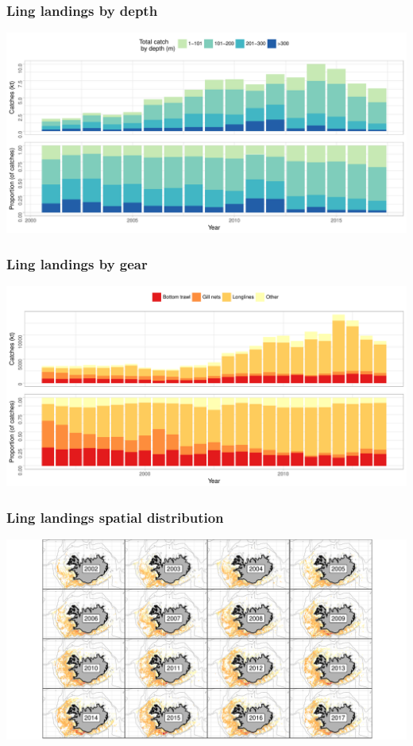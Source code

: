 \documentclass[sansserif]{beamer}\usepackage[]{graphicx}\usepackage[]{color}
\makeatletter
\def\maxwidth{ %
  \ifdim\Gin@nat@width>\linewidth
    \linewidth
  \else
    \Gin@nat@width
  \fi
}
\theoremstyle{example}
\makeatother
\begin{document}
\begin{frame}
\frametitle{Ling landings by depth}

\includegraphics[width=\maxwidth]{figure/depthdistplot-1} 

\end{frame}


\begin{frame}
\frametitle{Ling landings by gear}

\includegraphics[width=\maxwidth]{figure/catchdistplot-1} 

\end{frame}

\begin{frame}
\frametitle{Ling landings spatial distribution}

\includegraphics[width=\maxwidth]{figure/catchspatdistplot-1} 

\end{frame}
\end{document}
